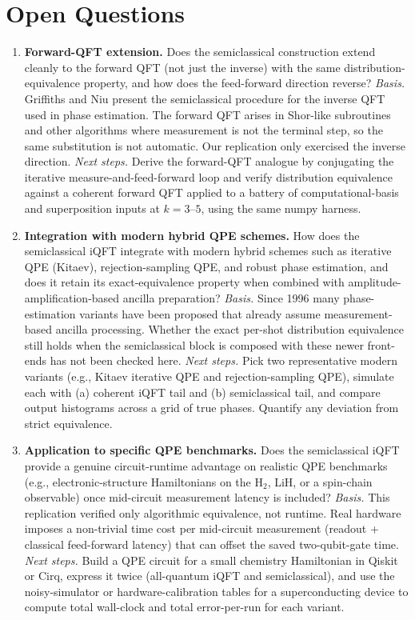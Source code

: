 \section{Open Questions}

\begin{enumerate}
\item \textbf{Forward-QFT extension.}
Does the semiclassical construction extend cleanly to the forward QFT
(not just the inverse) with the same distribution-equivalence property,
and how does the feed-forward direction reverse?
\emph{Basis.} Griffiths and Niu present the semiclassical procedure for
the inverse QFT used in phase estimation. The forward QFT arises in
Shor-like subroutines and other algorithms where measurement is not the
terminal step, so the same substitution is not automatic. Our replication
only exercised the inverse direction.
\emph{Next steps.} Derive the forward-QFT analogue by conjugating the
iterative measure-and-feed-forward loop and verify distribution
equivalence against a coherent forward QFT applied to a battery of
computational-basis and superposition inputs at $k=3\text{--}5$, using the
same numpy harness.

\item \textbf{Integration with modern hybrid QPE schemes.}
How does the semiclassical iQFT integrate with modern hybrid schemes such
as iterative QPE (Kitaev), rejection-sampling QPE, and robust phase
estimation, and does it retain its exact-equivalence property when
combined with amplitude-amplification-based ancilla preparation?
\emph{Basis.} Since 1996 many phase-estimation variants have been proposed
that already assume measurement-based ancilla processing. Whether the
exact per-shot distribution equivalence still holds when the semiclassical
block is composed with these newer front-ends has not been checked here.
\emph{Next steps.} Pick two representative modern variants (e.g., Kitaev
iterative QPE and rejection-sampling QPE), simulate each with (a)
coherent iQFT tail and (b) semiclassical tail, and compare output
histograms across a grid of true phases. Quantify any deviation from
strict equivalence.

\item \textbf{Application to specific QPE benchmarks.}
Does the semiclassical iQFT provide a genuine circuit-runtime advantage on
realistic QPE benchmarks (e.g., electronic-structure Hamiltonians on the
H$_2$, LiH, or a spin-chain observable) once mid-circuit measurement
latency is included?
\emph{Basis.} This replication verified only algorithmic equivalence, not
runtime. Real hardware imposes a non-trivial time cost per mid-circuit
measurement (readout + classical feed-forward latency) that can offset the
saved two-qubit-gate time.
\emph{Next steps.} Build a QPE circuit for a small chemistry Hamiltonian
in Qiskit or Cirq, express it twice (all-quantum iQFT and semiclassical),
and use the noisy-simulator or hardware-calibration tables for a
superconducting device to compute total wall-clock and total
error-per-run for each variant.


\end{enumerate}
